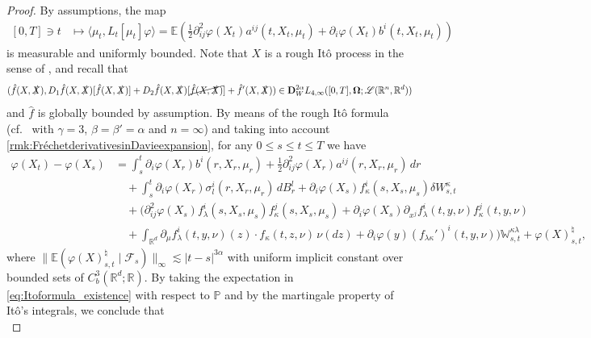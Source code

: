 \documentclass[10pt, a4paper]{article} %
\newcommand{\R}{\mathbb{R}}
\newcommand{\E}{\mathbb{E}}
\theoremstyle{definition}
\theoremstyle{plain}
\begin{document}
\begin{proof}
    By assumptions, the map \begin{equation*}
        \begin{split}
            [0,T] \ni t &\mapsto \langle \mu_t , L_t[\mu_t] \varphi \rangle = \E \left( \frac{1}{2} \partial^2_{ij} \varphi(X_t) a^{ij}(t,X_t,\mu_t) + \partial_i \varphi(X_t) b^i(t,X_t,\mu_t) \right)
        \end{split}
    \end{equation*}
    is measurable and uniformly bounded. 
    Note that $X$ is a rough It\^o process in the sense of \cite[Section 4.4.2]{FHL21}, and recall that $$(\hat f(X, \slashed{X}), D_1\hat{f}(X,\slashed{X}) [\hat{f}(X,\slashed{X})]  +D_2\hat{f}(X,\slashed{X}) [\cancel{\hat{f}(X,\slashed{X})}] + \hat f' (X, \slashed{X})) \in \mathbf{D}_W^{2\alpha} L_{4,\infty}([0,T], \mathbf{\Omega}; \mathscr{L}(\R^n,\R^d))$$ and $\hat f$ is globally bounded by assumption.  By means of the rough It\^o formula (cf.\ \cite[Theorem 4.13]{FHL21} with $\gamma = 3$, $\beta = \beta' = \alpha$ and $n=\infty$) and taking into account \cref{rmk:FréchetderivativesinDavieexpansion}, for any $0 \le s \le t \le T$ we have  \begin{equation}
        \begin{aligned} \label{eq:Itoformula_existence}
        \varphi(X_t) - \varphi(X_s) &= \int_s^t \partial_i \varphi(X_r) b^i(r,X_r,\mu_r) + \frac{1}{2} \partial^2_{ij} \varphi(X_r) a^{ij}(r,X_r,\mu_r) \, dr  \\
        &\quad + \int_s^t \partial_i \varphi(X_r) \sigma^i_l(r,X_r,\mu_r) \, dB^l_r  + \partial_i \varphi(X_s) f^i_\kappa(s,X_s,\mu_s) \delta W^\kappa_{s,t}   \\
        & \quad + \Big( \partial^2_{ij} \varphi(X_s) f^i_\lambda(s,X_s,\mu_s) f^j_\kappa(s,X_s,\mu_s) +  \partial_i \varphi(X_s) \partial_{x^j} f^i_\lambda(t,y,\nu) f^j_\kappa(t,y,\nu)  \\ 
         & \quad + \int_{\R^d} \partial_\mu f^i_\lambda(t,y,\nu)(z) \cdot f_\kappa(t,z,\nu) \, \nu(dz) + \partial_i \varphi(y)(f_{\lambda \kappa}')^i(t,y,\nu) \Big) \mathbb{W}^{\kappa\lambda}_{s,t} + \varphi(X)_{s,t}^\natural ,
        \end{aligned}
    \end{equation}  
    where $\|\E(\varphi(X)_{s,t}^\natural \mid \mathcal{F}_s)\|_\infty \lesssim |t-s|^{3\alpha}$ with uniform implicit constant over bounded sets of $C^3_b(\R^d;\R)$. 
    By taking the expectation in \eqref{eq:Itoformula_existence} with respect to $\mathbb{P}$ and by the martingale property of It\^o's integrals, we conclude that  \begin{equation*}

\end{equation*}
\end{proof}
\end{document}

